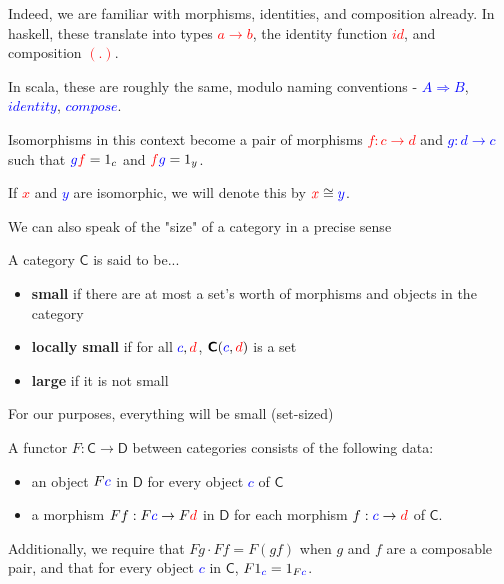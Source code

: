 \documentclass[tikz]{beamer}
\newcommand{\cat}[1]{\bm{ \mathsf{#1} }}
\newcommand{\cc}{\cat{C}}
\newcommand{\dd}{\cat{D}}
\newcommand{\red}[1]{\textcolor{red}{#1}}
\newcommand{\mred}[1]{\textcolor{red}{$#1$}}
\newcommand{\blue}[1]{\textcolor{blue}{#1}}
\newcommand{\mblue}[1]{\textcolor{blue}{$#1$}}
\theoremstyle{definition}
\begin{document}
\frame
{

	Indeed, we are familiar with morphisms, identities, and composition already. In haskell, these translate into types \mred{a \to b}, the identity function \mred{id}, and composition \mred{(.)}. 
	
	In scala, these are roughly the same, modulo naming conventions - \mblue{A \Rightarrow B}, \mblue{identity}, \mblue{compose}.  
}

\frame
{ 
	Isomorphisms in this context become a pair of morphisms \mred{ f : c \to d} and \mblue{g : d \to c} such that $\blue{g}\red{f} = 1_c$ and $\red{f}\blue{g} = 1_y$.
	
	 If \mred{x} and \mblue{y} are isomorphic, we will denote this by $\red{x} \cong \blue{y}$.
}

\frame
{
	We can also speak of the "size" of a category in a precise sense
}

\frame
{
	\begin{definition}
		A category $\cc$ is said to be...
		\begin{itemize}
			\item \textbf{small} if there are at most a set's worth of morphisms and objects in the category
			\item \textbf{locally small} if for all $\blue{c}, \red{d}$, $\cc(\blue{c}, \red{d})$ is a set
			\item \textbf{large} if it is not small
		\end{itemize}
	\end{definition}
}

\frame
{
	For our purposes, everything will be small (set-sized)
}

\frame
{
	
	\begin{definition}[Functor]
		A functor $F : \cc \to \dd$ between categories consists of the following data: 
		
		\begin{itemize}
			\item an object $F\blue{c}$ in $\dd$ for every object \mblue{c} of $\cc$
			\item a morphism $Ff : F\blue{c} \to F\red{d}$ in $\dd$ for each morphism $f : \blue{c} \to \red{d}$ of $\cc$.
		\end{itemize}
		
		Additionally, we require that $Fg \cdot Ff = F(gf)$ when $g$ and $f$ are a composable pair, and that for every object \mblue{c} in $\cc$, $F1_{\blue{c}} = 1_{F\blue{c}}$.
	\end{definition}
}
\end{document}
